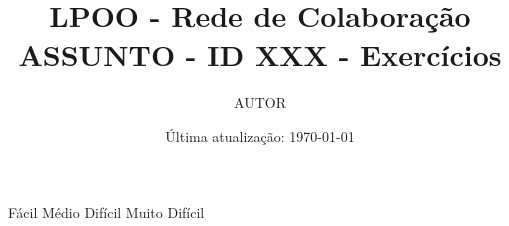 \documentclass[letterpaper,11pt]{exam}
\title{ LPOO - Rede de Colaboração \\
ASSUNTO - ID XXX - Exercícios }
\author{ AUTOR }
\date{ Última atualização: \today }
\begin{document}
\maketitle

\begin{questions}
  \question[\easy]  Fácil
  \setcounter{question}{25}
  \question[\medium] Médio
  \setcounter{question}{250}
  \question[\hard] Difícil
  \setcounter{question}{2500}
  \question[\veryhard] Muito Difícil
\end{questions}
\end{document}
